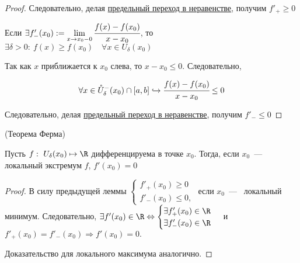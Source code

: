 \begin{proof}
{
	}
	
	Следовательно, делая \hyperlink{thm4.8}{предельный переход в неравенстве}, получим $f'_{+} \geq 0$
	
	Если $\exists f'_{-}(x_{0}) := \lim\limits_{x\to x_{0}-0} \cfrac{f(x)-f(x_{0})}{x-x_{0}}$, то
	$ \exists \delta > 0: \ f(x) \geq f(x_{0}) \quad \forall x\in U_{\delta}(x_{0})
	$
	
	Так как $x$ приближается к $x_{0}$ слева, то $x-x_{0} \leq 0$. Следовательно,
	
	$$\forall x \in \mathring{U}^{-}_{\delta} (x_{0}) \cap [a, b] \hookrightarrow \cfrac{f(x)-f(x_{0})}{x-x_{0}} \leq 0
	$$
	
	Следовательно, делая \hyperlink{thm4.8}{предельный переход в неравенстве}, получим $f'_{-} \leq 0$
\end{proof}

\begin{theorem}
	\hypertarget{thrm6.1}{(Теорема Ферма)} Пусть $f: \ U_{\delta}(x_{0}) \mapsto \R$ дифференцируема в точке $x_{0}$. Тогда, если $x_{0}$~---~ локальный экстремум $f$, $f'(x_{0}) = 0$
\end{theorem}
\begin{proof}
	В силу предыдущей леммы $ \begin{cases}
		f'_{+}(x_{0}) \geq 0 \\
		f'_{-}(x_{0}) \leq 0,
	\end{cases}$
	если $x_{0}$~---~ локальный минимум. Следовательно, $\exists f'(x_{0}) \in \R \Leftrightarrow \begin{cases}
		\exists f'_{+}(x_{0}) \in \R \\
		\exists f'_{-}(x_{0}) \in \R
	\end{cases}$
	и $f'_{+}(x_{0}) = f'_{-}(x_{0}) \Rightarrow f'(x_{0}) = 0.$
	
	Доказательство для локального максимума аналогично.
\end{proof}

